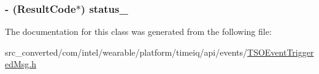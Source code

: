 \subsubsection[{status\+\_\+}]{\setlength{\rightskip}{0pt plus 5cm}-\/ ({\bf Result\+Code}$\ast$) status\+\_\+}\label{interface_t_s_o_event_triggered_msg_af9269dce72a2dfa75855f790b98e3a92}


The documentation for this class was generated from the following file\+:\begin{DoxyCompactItemize}
\item 
src\+\_\+converted/com/intel/wearable/platform/timeiq/api/events/\hyperlink{_t_s_o_event_triggered_msg_8h}{T\+S\+O\+Event\+Triggered\+Msg.\+h}\end{DoxyCompactItemize}
